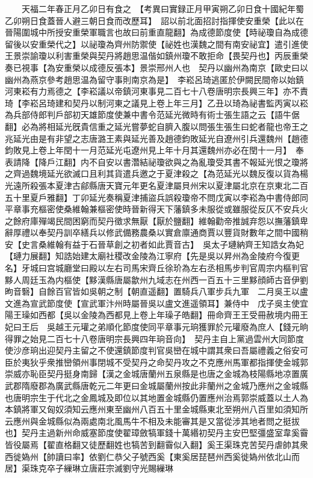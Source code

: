 　　天福二年春正月乙卯日有食之　【考異曰實録正月甲寅朔乙卯日食十國紀年蜀乙卯朔日食蓋晉人避三朝日食而改歷耳】　詔以前北面招討指揮使安重榮【此以在晉陽圍城中所授安重榮軍職言也故曰前重直龍翻】為成德節度使【時祕瓊自為成德留後以安重榮代之】以祕瓊為齊州防禦使【祕姓也漢魏之間有南安祕宜】遣引進使王景崇諭瓊以利害重榮與契丹將趙思温偕如鎮州瓊不敢拒命【畏契丹也】丙辰重榮奏已視事【為安重榮以成德反張本】景崇邢州人也　契丹以幽州為南京【歐史曰以幽州為燕京參考趙思温為留守事則南京為是】　李崧呂琦逃匿於伊闕民間帝以始鎮河東崧有力焉德之【李崧議以帝鎮河東事見二百七十八卷唐明宗長興三年】亦不責琦【李崧呂琦建和契丹以制河東之議見上卷上年三月】乙丑以琦為祕書監丙寅以崧為兵部侍郎判戶部初天雄節度使兼中書令范延光微時有術士張生語之云【語牛倨翻】必為將相延光旣貴信重之延光嘗夢蛇自臍入腹以問張生張生曰蛇者龍也帝王之兆延光由是有非望之志唐潞王素與延光善及趙德鈞敗延光自遼州引兵還魏州【趙德鈞敗見上卷上年閏十一月范延光屯遼州見上年十月其還魏州亦必在閏十一月】　奉表請降【降戶江翻】内不自安以書濳結祕瓊欲與之為亂瓊受其書不報延光恨之瓊將之齊過魏境延光欲滅口且利其貨遣兵邀之于夏津殺之【為范延光以魏反復以貨為楊光遠所殺張本夏津古鄃縣唐天寶元年更名夏津屬貝州宋以夏津屬北京在京東北二百五十里夏戶雅翻】丁卯延光奏稱夏津捕盜兵誤殺瓊帝不問戊寅以李崧為中書侍郎同平章事充樞密使桑維翰兼樞密使時晉新得天下藩鎮多未服從或雖服從反仄不安兵火之餘府庫殫竭民間困窮而契丹徵求無厭【厭於鹽翻】維翰勸帝推誠弃怨以撫藩鎮卑辭厚禮以奉契丹訓卒繕兵以修武備務農桑以實倉廪通商賈以豐貨財數年之間中國稍安【史言桑維翰有益于石晉草創之初者如此賈音古】　吳太子璉納齊王知誥女為妃【璉力展翻】知誥始建太廟社稷改金陵為江寧府【先是吳以昇州為金陵府今復更名】牙城曰宫城廳堂曰殿以左右司馬宋齊丘徐玠為左右丞相馬步判官周宗内樞判官黟人周廷玉為内樞使【黟漢縣唐屬歙州九域志在州西一百五十三里黟顔師古音伊劉昫音䃜】自餘百官皆如吳朝之制【朝直遥翻】置騎兵八軍步兵九軍　二月吳王以盧文進為宣武節度使【宣武軍汴州時屬晉吳以盧文進遥領耳】兼侍中　戊子吳主使宜陽王璪如西都【吳以金陵為西都見上卷上年璪子皓翻】冊命齊王王受冊赦境内冊王妃曰王后　吳越王元瓘之弟順化節度使同平章事元珦獲罪於元瓘廢為庶人【錢元晌得罪之始見二百七十八卷唐明宗長興四年珦音向】　契丹主自上黨過雲州大同節度使沙彦珦出迎契丹主留之不使還鎮節度判官吳巒在城中謂其衆曰吾屬禮義之俗安可臣於夷狄乎衆推巒領州事閉城不受契丹之命契丹攻之不克應州馬軍都指揮使金城郭崇威亦恥臣契丹挺身南歸【漢之金城唐蘭州五泉縣是也唐之金城為枝陽縣地凉置廣武郡隋廢郡為廣武縣唐乾元二年更曰金城屬蘭州按此非蘭州之金城乃應州之金城縣也唐明宗生于代北之金鳳城及即位以其地置金城縣仍置應州治焉郭崇威蓋以土人為本鎮將軍又匈奴須知云應州東至幽州八百五十里金城縣東北至朔州八百里如須知所云應州與金城縣似為兩處南北風馬牛不相及未能審其是又當從涉其地者問之挺拔也】契丹主過新州命威塞節度使翟璋斂犒軍錢十萬緡初契丹主安巴堅彊盛室韋奚霫皆役屬焉【翟直格翻又徒歷翻姓也犒苦到翻霫似入翻】奚王渠珠克苦契丹虐帥其衆西徙媯州【帥讀曰率】依劉仁恭父子號西奚【東奚居琵琶州西奚徙媯州依北山而居】渠珠克卒子繅琳立唐莊宗滅劉守光賜繅琳

